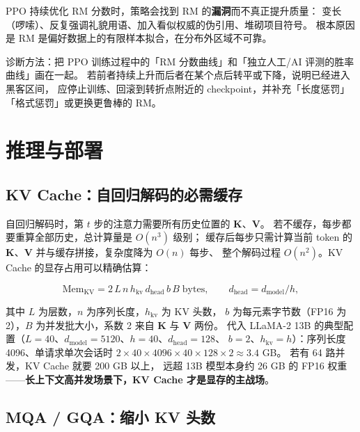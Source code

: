 \begin{pitfall}
PPO 持续优化 RM 分数时，策略会找到 RM 的\textbf{漏洞}而不真正提升质量：
变长（啰嗦）、反复强调礼貌用语、加入看似权威的伪引用、堆砌项目符号。
根本原因是 RM 是偏好数据上的有限样本拟合，在分布外区域不可靠。

诊断方法：把 PPO 训练过程中的「RM 分数曲线」和「独立人工/AI 评测的胜率曲线」画在一起。
若前者持续上升而后者在某个点后转平或下降，说明已经进入黑客区间，
应停止训练、回滚到转折点附近的 checkpoint，并补充「长度惩罚」「格式惩罚」或更换更鲁棒的 RM。
\end{pitfall}

\section{推理与部署}
\label{sec:nlp-inference}

\subsection{KV Cache：自回归解码的必需缓存}

自回归解码时，第 $t$ 步的注意力需要所有历史位置的 $\bm{K}$、$\bm{V}$。
若不缓存，每步都要重算全部历史，总计算量是 $O(n^3)$ 级别；
缓存后每步只需计算当前 token 的 $\bm{K}$、$\bm{V}$ 并与缓存拼接，复杂度降为 $O(n)$ 每步、
整个解码过程 $O(n^2)$。KV Cache 的显存占用可以精确估算：

\begin{equation}
\text{Mem}_{\text{KV}} = 2 \, L \, n \, h_{\text{kv}} \, d_{\text{head}} \, b \, B \; \text{bytes},
\qquad d_{\text{head}} = d_{\text{model}} / h ,
\label{eq:kv-cache}
\end{equation}

其中 $L$ 为层数，$n$ 为序列长度，$h_{\text{kv}}$ 为 KV 头数，
$b$ 为每元素字节数（FP16 为 2），$B$ 为并发批大小，系数 2 来自 $\bm{K}$ 与 $\bm{V}$ 两份。
代入 LLaMA-2 13B 的典型配置（$L = 40$、$d_{\text{model}} = 5120$、$h = 40$、$d_{\text{head}} = 128$、
$b = 2$、$h_{\text{kv}} = h$）：序列长度 4096、单请求单次会话时
$2 \times 40 \times 4096 \times 40 \times 128 \times 2 \approx 3.4$ GB。
若有 64 路并发，KV Cache 就要 200 GB 以上，
远超 13B 模型本身约 26 GB 的 FP16 权重——\textbf{长上下文高并发场景下，KV Cache 才是显存的主战场}。

\subsection{MQA / GQA：缩小 KV 头数}

